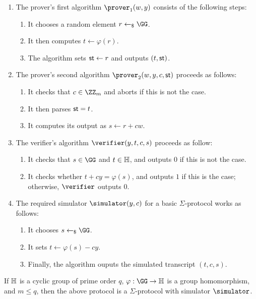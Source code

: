 \documentclass[runningheads]{llncs}
\begin{document}
\begin{enumerate}
  \item
    The prover's first algorithm $\prover_1(w,y)$ consists of the following steps:
    \begin{enumerate}
      \item
        It chooses a random element $r\getsr\GG$.
      \item
        It then computes $t\gets\varphi(r)$.
      \item
	The algorithm sets $\mathsf{st}\gets r$ and outputs $(t,\mathsf{st})$.
    \end{enumerate}
  \item
    The prover's second algorithm $\prover_2(w,y,c,\st)$ proceeds as follows:
    \begin{enumerate}
      \item
        It checks that $c\in\ZZ_m$ and aborts if this is not the case.
      \item
	It then parses $\mathsf{st}=t$.
      \item
        It computes its output as $s\gets r+cw$.
    \end{enumerate}
  \item
    The verifier's algorithm $\verifier(y,t,c,s)$ proceeds as follow:
    \begin{enumerate}
      \item
        It checks that $s\in\GG$ and $t\in\mathbb{H}$, and outputs $0$ if this is not the case.
      \item
	It checks whether $t + cy = \varphi(s)$, and outputs $1$ if this is the case; otherwise, $\verifier$ outputs $0$.
    \end{enumerate}
  \item
    The required simulator $\simulator(y,c)$ for a basic $\Sigma$-protocol works as follows:
    \begin{enumerate}
      \item
        It chooses $s\getsr\GG$.
      \item
        It sets $t \gets \varphi(s) - cy$.
      \item
        Finally, the algorithm ouputs the simulated transcript $(t,c,s)$.
    \end{enumerate}
\end{enumerate}


\begin{theorem}
  If $\mathbb{H}$ is a cyclic group of prime order $q$, $\varphi:\GG\to\HH$ is a group homomorphism, and $m\leq q$, then the above protocol is a $\Sigma$-protocol with simulator $\simulator$.
\end{theorem}
\end{document}
